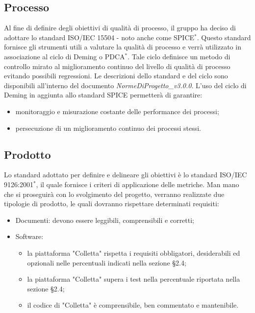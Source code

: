 \subsection{Processo}
Al fine di definire degli obiettivi di qualità di processo, il gruppo ha deciso di adottare lo standard ISO/IEC 15504 - noto anche come SPICE$^*$. Questo standard fornisce gli strumenti utili a valutare la qualità di processo e verrà utilizzato in associazione al ciclo di Deming o PDCA$^*$. Tale ciclo definisce un metodo di controllo mirato al miglioramento continuo del livello di qualità di processo evitando possibili regressioni. 
Le descrizioni dello standard e del ciclo sono disponibili all'interno del documento \textit{NormeDiProgetto\_v3.0.0}.
L'uso del ciclo di Deming in aggiunta allo standard SPICE permetterà di garantire:
\begin{itemize}
	\item monitoraggio e misurazione costante delle performance dei processi;
	\item persecuzione di un miglioramento continuo dei processi stessi.
\end{itemize}

\subsection{Prodotto}
Lo standard adottato per definire e delineare gli obiettivi è lo standard ISO/IEC 9126:2001$^*$, il quale fornisce i criteri di applicazione delle metriche.
Man mano che si proseguirà con lo svolgimento del progetto, verranno realizzate due tipologie di prodotto, le quali dovranno rispettare determinati requisiti:
\begin{itemize}
	\item Documenti: devono essere leggibili, comprensibili e corretti;
	\item Software: 
	\begin{itemize}
		\item la piattaforma "Colletta" rispetta i requisiti obbligatori, desiderabili ed opzionali nelle percentuali indicati nella sezione \S2.4;
		\item la piattaforma "Colletta" supera i test nella percentuale riportata nella sezione \S2.4;
		\item il codice di "Colletta" è comprensibile, ben commentato e mantenibile.
	\end{itemize}
\end{itemize}

\newpage

